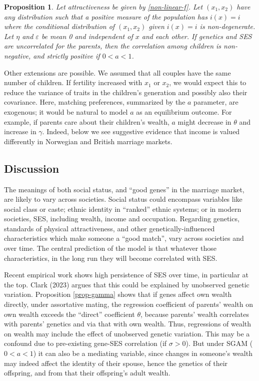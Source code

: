 \documentclass[
  12pt,
]{article}
\newtheorem{proposition}{Proposition}
\theoremstyle{definition}
\theoremstyle{definition}
\theoremstyle{definition}
\theoremstyle{definition}
\theoremstyle{remark}
\begin{document}
\begin{proposition}\label{prop-non-normal}
Let attractiveness be given by \eqref{non-linear-f}. Let $(x_1, x_2)$ have
any distribution such that a positive measure of the population has
$i(x) = i$ where the conditional distribution of $(x_1, x_2)$ given $i(x) = i$ is 
non-degenerate. Let $\eta$ and $\varepsilon$ be mean 0 and independent of
$x$ and each other. If genetics and SES are uncorrelated for the parents, then
the correlation among children is non-negative, and strictly positive if 
$0 < a < 1$.
\end{proposition}

Other extensions are possible. We assumed that all couples have the same number
of children. If fertility increased with \(x_1\) or \(x_2\), we would expect this to
reduce the variance of traits in the children's generation and possibly also
their covariance. Here, matching preferences, summarized by the \(a\) parameter,
are exogenous; it would be natural to model \(a\) as an equilibrium outcome.
For example, if parents care about their children's wealth, \(a\) might decrease
in \(\theta\) and increase in \(\gamma\). Indeed, below we see suggestive evidence that
income is valued differently in Norwegian and British marriage markets.

\hypertarget{discussion}{%
\subsection{Discussion}\label{discussion}}

The meanings of both social status, and ``good genes'' in the
marriage market, are likely to vary across societies. Social status could
encompass variables like social class or caste; ethnic identity in
``ranked'' ethnic systems; or in modern societies, SES, including wealth, income
and occupation. Regarding genetics, standards of physical attractiveness, and
other genetically-influenced characteristics which make someone a ``good match'',
vary across societies and over time. The central prediction of the model is that
whatever those characteristics, in the long run they will become correlated with
SES.

Recent empirical work shows high persistence of SES over time, in particular at
the top. Clark (2023) argues that this could be explained by unobserved
genetic variation.
Proposition \ref{prop-gamma} shows that if genes affect own wealth directly,
under assortative mating, the regression coefficient of parents' wealth on own
wealth exceeds the ``direct'' coefficient \(\theta\), because parents' wealth
correlates with parents' genetics and via that with own wealth. Thus,
regressions of wealth on wealth may include the effect of unobserved genetic
variation. This may be a confound due to pre-existing gene-SES correlation (if
\(\sigma > 0\)). But under SGAM (\(0 < a < 1\)) it can also be a mediating
variable, since changes in someone's wealth may indeed affect the identity of
their spouse, hence the genetics of their offspring, and from that their
offspring's adult wealth.
\end{document}
